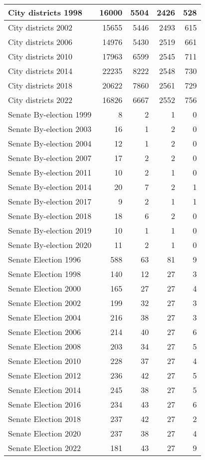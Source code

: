 \begin{tabular}{l|r|r|r|r}
\hline
City districts 1998 & 16000 & 5504 & 2426 & 528\\
\hline
City districts 2002 & 15655 & 5446 & 2493 & 615\\
\hline
City districts 2006 & 14976 & 5430 & 2519 & 661\\
\hline
City districts 2010 & 17963 & 6599 & 2545 & 711\\
\hline
City districts 2014 & 22235 & 8222 & 2548 & 730\\
\hline
City districts 2018 & 20622 & 7860 & 2561 & 729\\
\hline
City districts 2022 & 16826 & 6667 & 2552 & 756\\
\hline
Senate By-election 1999 & 8 & 2 & 1 & 0\\
\hline
Senate By-election 2003 & 16 & 1 & 2 & 0\\
\hline
Senate By-election 2004 & 12 & 1 & 2 & 0\\
\hline
Senate By-election 2007 & 17 & 2 & 2 & 0\\
\hline
Senate By-election 2011 & 10 & 2 & 1 & 0\\
\hline
Senate By-election 2014 & 20 & 7 & 2 & 1\\
\hline
Senate By-election 2017 & 9 & 2 & 1 & 1\\
\hline
Senate By-election 2018 & 18 & 6 & 2 & 0\\
\hline
Senate By-election 2019 & 10 & 1 & 1 & 0\\
\hline
Senate By-election 2020 & 11 & 2 & 1 & 0\\
\hline
Senate Election 1996 & 588 & 63 & 81 & 9\\
\hline
Senate Election 1998 & 140 & 12 & 27 & 3\\
\hline
Senate Election 2000 & 165 & 27 & 27 & 4\\
\hline
Senate Election 2002 & 199 & 32 & 27 & 3\\
\hline
Senate Election 2004 & 216 & 38 & 27 & 3\\
\hline
Senate Election 2006 & 214 & 40 & 27 & 6\\
\hline
Senate Election 2008 & 203 & 34 & 27 & 5\\
\hline
Senate Election 2010 & 228 & 37 & 27 & 4\\
\hline
Senate Election 2012 & 236 & 42 & 27 & 5\\
\hline
Senate Election 2014 & 245 & 38 & 27 & 5\\
\hline
Senate Election 2016 & 234 & 43 & 27 & 6\\
\hline
Senate Election 2018 & 237 & 42 & 27 & 2\\
\hline
Senate Election 2020 & 237 & 38 & 27 & 4\\
\hline
Senate Election 2022 & 181 & 43 & 27 & 9\\
\hline
\end{tabular}
